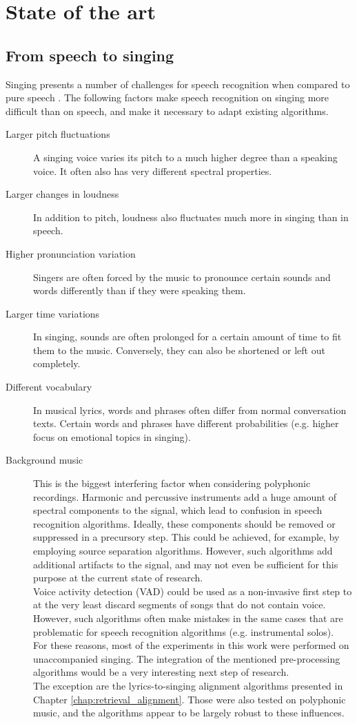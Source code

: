 \chapter{State of the art}	\label{chap:sota}
\section{From speech to singing} \label{sec:speech_to_singing}
Singing presents a number of challenges for speech recognition when compared to pure speech \cite{loscos} \cite{goto_alignment} \cite{kruspe_kws1}. The following factors make speech recognition on singing more difficult than on speech, and make it necessary to adapt existing algorithms.
\begin{description}
 \item[Larger pitch fluctuations] A singing voice varies its pitch to a much higher degree than a speaking voice. It often also has very different spectral properties.
 \item[Larger changes in loudness] In addition to pitch, loudness also fluctuates much more in singing than in speech.
 \item[Higher pronunciation variation] Singers are often forced by the music to pronounce certain sounds and words differently than if they were speaking them.
 \item[Larger time variations] In singing, sounds are often prolonged for a certain amount of time to fit them to the music. Conversely, they can also be shortened or left out completely.
 \item[Different vocabulary] In musical lyrics, words and phrases often differ from normal conversation texts. Certain words and phrases have different probabilities (e.g. higher focus on emotional topics in singing).
 \item[Background music] This is the biggest interfering factor when considering polyphonic recordings. Harmonic and percussive instruments add a huge amount of spectral components to the signal, which lead to confusion in speech recognition algorithms. Ideally, these components should be removed or suppressed in a precursory step. This could be achieved, for example, by employing source separation algorithms. However, such algorithms add additional artifacts to the signal, and may not even be sufficient for this purpose at the current state of research.\\
 Voice activity detection (VAD) could be used as a non-invasive first step to at the very least discard segments of songs that do not contain voice. However, such algorithms often make mistakes in the same cases that are problematic for speech recognition algorithms (e.g. instrumental solos)\cite{}.\\
 For these reasons, most of the experiments in this work were performed on unaccompanied singing. The integration of the mentioned pre-processing algorithms would be a very interesting next step of research.\\
 The exception are the lyrics-to-singing alignment algorithms presented in Chapter \ref{chap:retrieval_alignment}. Those were also tested on polyphonic music, and the algorithms appear to be largely robust to these influences.
 \end{description}
